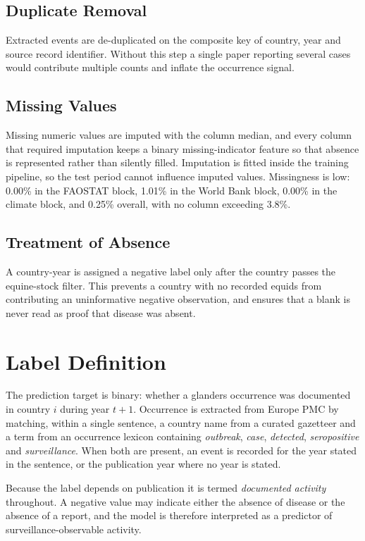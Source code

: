 \documentclass[10pt,openany]{report}
\begin{document}
\subsection{Duplicate Removal}

Extracted events are de-duplicated on the composite key of country, year and source record
identifier. Without this step a single paper reporting several cases would contribute multiple
counts and inflate the occurrence signal.

\subsection{Missing Values}

Missing numeric values are imputed with the column median, and every column that required
imputation keeps a binary missing-indicator feature so that absence is represented rather than
silently filled. Imputation is fitted inside the training pipeline, so the test period cannot
influence imputed values. Missingness is low: 0.00\% in the FAOSTAT block, 1.01\% in the
World Bank block, 0.00\% in the climate block, and 0.25\% overall, with no column
exceeding 3.8\%.

\subsection{Treatment of Absence}

A country-year is assigned a negative label only after the country passes the equine-stock
filter. This prevents a country with no recorded equids from contributing an uninformative
negative observation, and ensures that a blank is never read as proof that disease was absent.

\section{Label Definition}

The prediction target is binary: whether a glanders occurrence was documented in country $i$
during year $t+1$. Occurrence is extracted from Europe PMC by matching, within a single sentence,
a country name from a curated gazetteer and a term from an occurrence lexicon containing
\emph{outbreak}, \emph{case}, \emph{detected}, \emph{seropositive} and \emph{surveillance}. When
both are present, an event is recorded for the year stated in the sentence, or the publication
year where no year is stated.

Because the label depends on publication it is termed \emph{documented activity} throughout. A
negative value may indicate either the absence of disease or the absence of a report, and the
model is therefore interpreted as a predictor of surveillance-observable activity.
\end{document}
